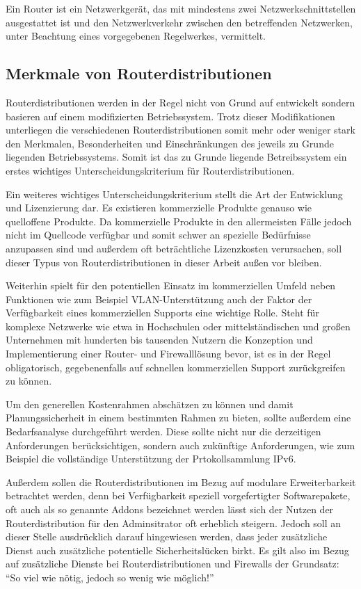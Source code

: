 \documentclass[a4paper,12pt]{scrartcl}
\begin{document}
Ein Router ist ein Netzwerkgerät, das mit mindestens zwei
Netzwerkschnittstellen ausgestattet ist und den Netzwerkverkehr zwischen den
betreffenden Netzwerken, unter Beachtung eines vorgegebenen Regelwerkes,
vermittelt.

\subsection{Merkmale von Routerdistributionen}
Routerdistributionen werden in der Regel nicht von Grund auf entwickelt sondern
basieren auf einem modifizierten Betriebssystem. Trotz dieser Modifikationen
unterliegen die verschiedenen Routerdistributionen somit mehr oder weniger
stark den Merkmalen, Besonderheiten und Einschr\"ankungen des jeweils zu Grunde
liegenden Betriebssystems. Somit ist das zu Grunde liegende Betreibssystem ein
erstes wichtiges Unterscheidungskriterium f\"ur Routerdistributionen.

Ein weiteres wichtiges Unterscheidungskriterium stellt die Art der Entwicklung
und Lizenzierung dar. Es existieren kommerzielle Produkte genauso wie
quelloffene Produkte. Da kommerzielle Produkte in den allermeisten F\"alle
jedoch nicht im Quellcode verf\"ugbar und somit schwer an spezielle
Bed\"urfnisse anzupassen sind und au\ss{}erdem oft betr\"achtliche Lizenzkosten
verursachen, soll dieser Typus von Routerdistributionen in dieser Arbeit
au\ss{}en vor bleiben. 
 
Weiterhin spielt f\"ur den potentiellen Einsatz im kommerziellen Umfeld
neben Funktionen wie zum Beispiel VLAN-Unterst\"utzung auch der Faktor der
Verf\"ugbarkeit eines kommerziellen Supports eine wichtige Rolle. Steht f\"ur
komplexe Netzwerke wie etwa in Hochschulen oder mittelst\"andischen und
gro\ss{}en Unternehmen mit hunderten bis tausenden Nutzern die Konzeption und
Implementierung einer Router- und Firewalll\"osung bevor, ist es in der Regel
obligatorisch, gegebenenfalls auf schnellen kommerziellen Support
zur\"uckgreifen zu k\"onnen.

Um den generellen Kostenrahmen absch\"atzen zu k\"onnen und damit
Planungssicherheit in einem bestimmten Rahmen zu bieten, sollte au\ss{}erdem
eine Bedarfsanalyse durchgef\"uhrt werden. Diese sollte nicht nur die
derzeitigen Anforderungen ber\"ucksichtigen, sondern auch zuk\"unftige Anforderungen,
wie zum Beispiel die vollst\"andige Unterst\"utzung der Prtokollsammlung IPv6.

Au\ss{}erdem sollen die Routerdistributionen im Bezug auf modulare
Erweiterbarkeit betrachtet werden, denn bei Verf\"ugbarkeit speziell
vorgefertigter Softwarepakete, oft auch als so genannte Addons bezeichnet
werden l\"asst sich der Nutzen der Routerdistribution f\"ur den Adminsitrator
oft erheblich steigern. Jedoch soll an dieser Stelle ausdr\"ucklich darauf
hingewiesen werden, dass jeder zus\"atzliche Dienst auch zus\"atzliche
potentielle Sicherheitsl\"ucken birkt. Es gilt also im Bezug auf zus\"atzliche
Dienste bei Routerdistributionen und Firewalls der Grundsatz: ``So viel wie
n\"otig, jedoch so wenig wie m\"oglich!''
 
\end{document}
